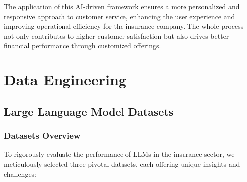 \documentclass[conference]{IEEEtran}
\begin{document}
The application of this AI-driven framework ensures a more personalized and responsive approach to customer service, enhancing the user experience and improving operational efficiency for the insurance company. The whole process not only contributes to higher customer satisfaction but also drives better financial performance through customized offerings.


\section{Data Engineering}

\subsection{Large Language Model Datasets}

\subsubsection{Datasets Overview}

To rigorously evaluate the performance of LLMs in the insurance sector, we meticulously selected three pivotal datasets, each offering unique insights and challenges:
\end{document}

